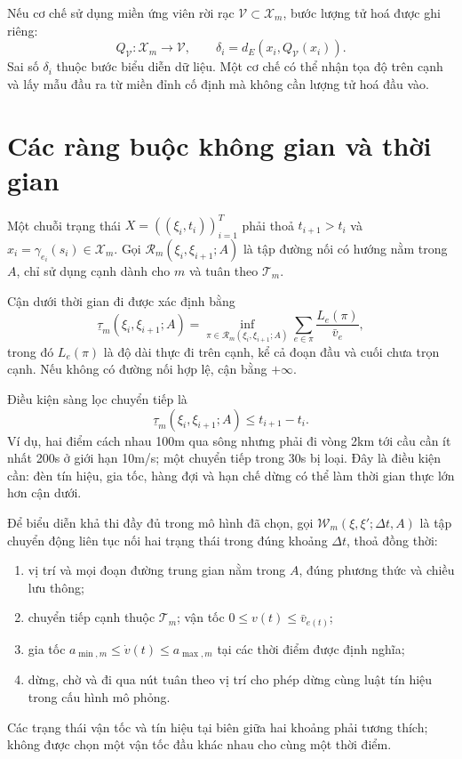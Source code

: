 \documentclass[12pt,a4paper,oneside]{report}
\begin{document}
Nếu cơ chế sử dụng miền ứng viên rời rạc $\mathcal V\subset\mathcal X_m$, bước lượng tử hoá được ghi riêng:
\[
Q_{\mathcal V}:\mathcal X_m\longrightarrow\mathcal V,\qquad
\delta_i=d_E(x_i,Q_{\mathcal V}(x_i)).
\]
Sai số $\delta_i$ thuộc bước biểu diễn dữ liệu. Một cơ chế có thể nhận tọa độ trên cạnh và lấy mẫu đầu ra từ miền đỉnh cố định mà không cần lượng tử hoá đầu vào.

\section{Các ràng buộc không gian và thời gian}

Một chuỗi trạng thái $X=((\xi_i,t_i))_{i=1}^{T}$ phải thoả $t_{i+1}>t_i$ và $x_i=\gamma_{e_i}(s_i)\in\mathcal X_m$. Gọi $\mathcal R_m(\xi_i,\xi_{i+1};A)$ là tập đường nối có hướng nằm trong $A$, chỉ sử dụng cạnh dành cho $m$ và tuân theo $\mathcal T_m$.

Cận dưới thời gian đi được xác định bằng
\begin{equation}
\underline\tau_m(\xi_i,\xi_{i+1};A)
=\inf_{\pi\in\mathcal R_m(\xi_i,\xi_{i+1};A)}
\sum_{e\in\pi}\frac{L_e(\pi)}{\bar v_e},
\label{eq:minimum-travel-time}
\end{equation}
trong đó $L_e(\pi)$ là độ dài thực đi trên cạnh, kể cả đoạn đầu và cuối chưa trọn cạnh. Nếu không có đường nối hợp lệ, cận bằng $+\infty$.

Điều kiện sàng lọc chuyển tiếp là
\begin{equation}
\underline\tau_m(\xi_i,\xi_{i+1};A)\le t_{i+1}-t_i.
\label{eq:urban-transition}
\end{equation}
Ví dụ, hai điểm cách nhau 100m qua sông nhưng phải đi vòng 2km tới cầu cần ít nhất 200s ở giới hạn 10m/s; một chuyển tiếp trong 30s bị loại. Đây là điều kiện cần: đèn tín hiệu, gia tốc, hàng đợi và hạn chế dừng có thể làm thời gian thực lớn hơn cận dưới.

Để biểu diễn khả thi đầy đủ trong mô hình đã chọn, gọi $\mathcal W_m(\xi,\xi';\Delta t,A)$ là tập chuyển động liên tục nối hai trạng thái trong đúng khoảng $\Delta t$, thoả đồng thời:
\begin{enumerate}
  \item vị trí và mọi đoạn đường trung gian nằm trong $A$, đúng phương thức và chiều lưu thông;
  \item chuyển tiếp cạnh thuộc $\mathcal T_m$; vận tốc $0\le v(t)\le\bar v_{e(t)}$;
  \item gia tốc $a_{\min,m}\le\dot v(t)\le a_{\max,m}$ tại các thời điểm được định nghĩa;
  \item dừng, chờ và đi qua nút tuân theo vị trí cho phép dừng cùng luật tín hiệu trong cấu hình mô phỏng.
\end{enumerate}
Các trạng thái vận tốc và tín hiệu tại biên giữa hai khoảng phải tương thích; không được chọn một vận tốc đầu khác nhau cho cùng một thời điểm.
\end{document}
